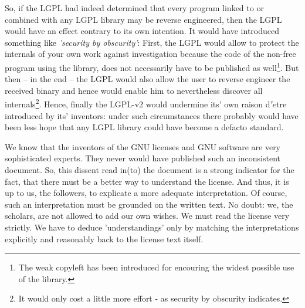 So, if the LGPL had indeed determined that every program linked to or combined
with any LGPL library may be reverse engineered, then the LGPL would have an
effect contrary to its own intention. It would have introduced something like
\emph{'security by obscurity'}: First, the LGPL would allow to protect the
internals of your own work against investigation because the code of the
non-free program using the library, does not necessarily have to be published
as well\footnote{The weak copyleft has been introduced for encouring the widest
possible use of the library.}. But then -- in the end -- the LGPL would also
allow the user to reverse engineer the received binary and hence would enable
him to nevertheless discover all internals\footnote{It would only cost a little
more effort - as security by obscurity indicates.}. Hence, finally the LGPL-v2
would undermine its' own raison d'$\grave{e}$tre introduced by its' inventors:
under such circumstances there probably would have been less hope that any LGPL
library could have become a defacto standard.

We know that the inventors of the GNU licenses and GNU software are very
sophisticated experts. They never would have published such an inconsistent
document. So, this dissent read in(to) the document is a strong indicator for
the fact, that there must be a better way to understand the license. And thus,
it is up to us, the followers, to explicate a more adequate interpretation. Of
course, such an interpretation must be grounded on the written text. No doubt:
we, the scholars, are not allowed to add our own wishes. We must read the
license very strictly. We have to deduce 'understandings' only by matching the
interpretations explicitly and reasonably back to the license text itself.

